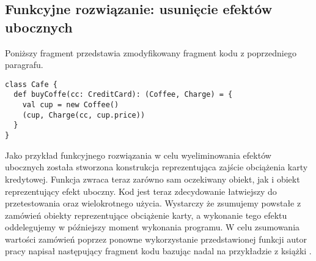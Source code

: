\documentclass[../main.tex]{subfiles}
\begin{document}
\subsection{Funkcyjne rozwiązanie: usunięcie efektów ubocznych}
Poniższy fragment przedstawia zmodyfikowany fragment kodu z poprzedniego paragrafu.
\begin{lstlisting}[caption=Funkcja bez efektów ubocznych. . Przykład zaczerpnięty z \cite{BOOK:FPinScala}]
class Cafe { 
  def buyCoffe(cc: CreditCard): (Coffee, Charge) = {
    val cup = new Coffee()
    (cup, Charge(cc, cup.price))
  }
}
\end{lstlisting}
Jako przykład funkcyjnego rozwiązania w celu wyeliminowania efektów ubocznych została stworzona konstrukcja reprezentująca zajście obciążenia karty kredytowej. Funkcja zwraca teraz zarówno sam oczekiwany obiekt, jak i obiekt reprezentujący efekt uboczny. Kod jest teraz zdecydowanie łatwiejszy do przetestowania oraz wielokrotnego użycia. Wystarczy że zsumujemy powstałe z zamówień obiekty reprezentujące obciążenie karty, a wykonanie tego efektu oddelegujemy w późniejszy moment wykonania programu.
W celu zsumowania wartości zamówień poprzez ponowne wykorzystanie przedstawionej funkcji autor pracy napisał następujący fragment kodu bazując nadal na przykładzie z książki \cite{BOOK:FPinScala}.
\end{document}
